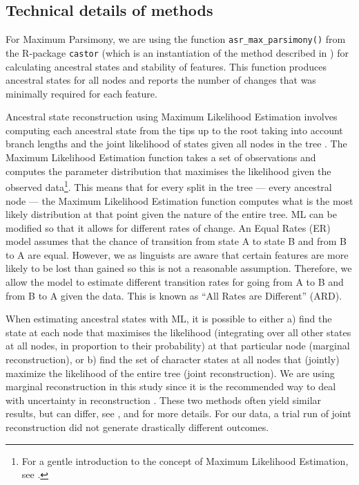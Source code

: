 \documentclass[a4paper,10pt]{article} %
\begin{document}
\subsection{Technical details of methods}
\label{supp:tech_details}

For Maximum Parsimony, we are using the function \texttt{asr\_max\_parsimony()} from the R-package \texttt{castor} \citep{louca2017efficient} (which is an instantiation of the method described in \citet{sankoff1975minimal}) for calculating ancestral states and stability of features. This function produces ancestral states for all nodes and reports the number of changes that was minimally required for each feature. 


Ancestral state reconstruction using Maximum Likelihood Estimation involves computing each ancestral state from the tips up to the root taking into account branch lengths and the joint likelihood of states given all nodes in the tree \citep{wilks1938large, fisher1912absolute, pagel1994detecting, cunningham1998reconstructing}. The Maximum Likelihood Estimation function takes a set of observations and computes the parameter distribution that maximises the likelihood given the observed data\footnote{For a gentle introduction to the concept of Maximum Likelihood Estimation, see \citet{jonny_ML}.}. This means that for every split in the tree --- every ancestral node --- the Maximum Likelihood Estimation function computes what is the most likely distribution at that point given the nature of the entire tree. ML can be modified so that it allows for different rates of change. An Equal Rates (ER) model assumes that the chance of transition from state A to state B and from B to A are equal. However, we as linguists are aware that certain features are more likely to be lost than gained so this is not a reasonable assumption. Therefore, we allow the model to estimate different transition rates for going from A to B and from B to A given the data. This is known as ``All Rates are Different'' (ARD).

When estimating ancestral states with ML, it is possible to either a) find the state at each node that maximises the likelihood (integrating over all other states at all nodes, in proportion to their probability) at that particular node (marginal reconstruction), or b) find the set of character states at all nodes that (jointly) maximize the likelihood of the entire tree (joint reconstruction). We are using marginal reconstruction in this study since it is the recommended way to deal with uncertainty in reconstruction \citep{revell_2014}. These two methods often yield similar results, but can differ, see \citet[259-260]{felsenstein2004inferring},  \citet[121-126]{yang2006computational} and \citet[5]{joy2016ancestral} for more details. For our data, a trial run of joint reconstruction did not generate drastically different outcomes.
\end{document}
